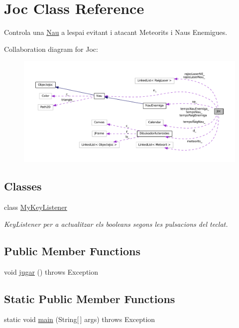 \hypertarget{class_joc}{}\section{Joc Class Reference}
\label{class_joc}


Controla una \hyperlink{class_nau}{Nau} a l\textquotesingle{}espai evitant i atacant Meteorits i Naus Enemigues.  




Collaboration diagram for Joc\+:\nopagebreak
\begin{figure}[H]
\begin{center}
\leavevmode
\includegraphics[width=350pt]{class_joc__coll__graph}
\end{center}
\end{figure}
\subsection*{Classes}
\begin{DoxyCompactItemize}
\item 
class \hyperlink{class_joc_1_1_my_key_listener}{My\+Key\+Listener}
\begin{DoxyCompactList}\small\item\em Key\+Listener per a actualitzar els booleans segons les pulsacions del teclat. \end{DoxyCompactList}\end{DoxyCompactItemize}
\subsection*{Public Member Functions}
\begin{DoxyCompactItemize}
\item 
void \hyperlink{class_joc_aa5da4464cac2dc81f26430ac16fa7029}{jugar} ()  throws Exception 
\end{DoxyCompactItemize}
\subsection*{Static Public Member Functions}
\begin{DoxyCompactItemize}
\item 
static void \hyperlink{class_joc_a54cbe41c97ce7489f7b0cc62217a7d29}{main} (String\mbox{[}$\,$\mbox{]} args)  throws Exception 
\end{DoxyCompactItemize}

